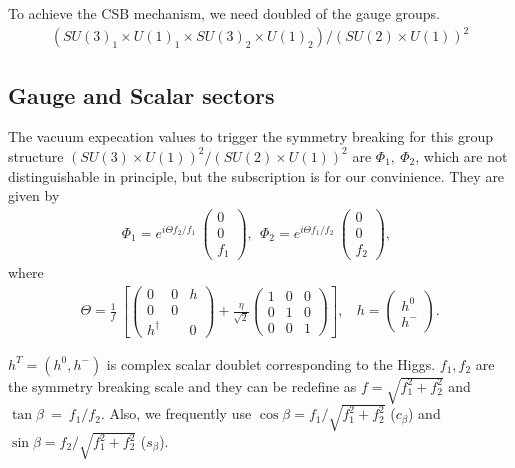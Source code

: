To achieve the CSB mechanism, we need doubled of the gauge groups.
\begin{align}
 (SU(3)_1\times U(1)_1 \times SU(3)_2\times U(1)_2)/ (SU(2)\times U(1))^2 \label{eq:gaugegroup}
\end{align}

\subsection*{Gauge and Scalar sectors}
The vacuum expecation values to trigger the symmetry breaking 
for this group structure $(SU(3)\times U(1))^2/ (SU(2)\times U(1))^2$
are $\Phi_1, ~ \Phi_2$, which are not distinguishable in principle, 
but the subscription is for our convinience.
They are given by
\begin{align}
 \Phi_1 = e^{i\Theta f_2/f_1}  ~ \left( \begin{array}{c}
  0 \\
  0  \\
  f_1
  \end{array}\right) ,~~
  \Phi_2 = e^{i\Theta f_1/f_2}  ~ \left( \begin{array}{c}
  0 \\
  0  \\
  f_2
  \end{array}\right) ,~~ 
\end{align}
where 
\begin{align}
 \Theta = \frac{1}{f} ~ \left[ \left( \begin{array}{ccc}
  0 & 0 & h\\
  0 & 0 &  \\
  h^\dagger & & 0
  \end{array}\right) 
  + \frac{\eta}{\sqrt{2}} \left( \begin{array}{ccc}
  1 & 0 & 0 \\
  0 & 1 & 0 \\
  0 & 0 & 1
  \end{array}\right)   \right], ~~~~ 
  h = \left( \begin{array}{c}
              h^0\\
              h^-
             \end{array}    \right) . 
\end{align}

$h^T=(h^0, h^-)$ is complex scalar doublet corresponding to the Higgs.
$f_1, f_2$ are the symmetry breaking scale and 
they can be redefine as $f=\sqrt{f_1^2 + f_2^2}$ and $\tan \beta~=~f_1 /f_2$.
Also, we frequently use $\cos\beta=f_1/\sqrt{f_1^2 + f_2^2}$ ($c_\beta$) 
and $\sin\beta=f_2/\sqrt{f_1^2 + f_2^2}$ ($s_\beta$).



